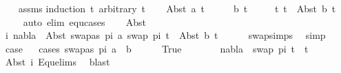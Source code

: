 \begin{isabellebody}
%
\isadelimproof
\ \ %
\endisadelimproof
%
\isatagproof
{}\isamarkupfalse%
\ assms\isanewline
{}\isamarkupfalse%
{\isacharparenleft}{\kern0pt}induction\ t{}\ arbitrary{\isacharcolon}{\kern0pt}\ t{}{\isacharparenright}{\kern0pt}\isanewline
\ \ \isamarkupfalse%
\ {\isacharparenleft}{\kern0pt}Abst\ a\ t{}{\isacharprime}{\kern0pt}{\isacharparenright}{\kern0pt}\isanewline
\ \ \isamarkupfalse%
\ \isamarkupfalse%
\ b\ t{}{\isacharprime}{\kern0pt}\isanewline
\ \ \ \ \ t{}{\isacharcolon}{\kern0pt}\ {\isachardoublequoteopen}t{}\ {\isacharequal}{\kern0pt}\ Abst\ b\ t{}{\isacharprime}{\kern0pt}{\isachardoublequoteclose}\isanewline
\ \ \ \ \isamarkupfalse%
{\isacharparenleft}{\kern0pt}auto\ elim{\isacharcolon}{\kern0pt}\ equ{\isachardot}{\kern0pt}cases{\isacharparenright}{\kern0pt}\isanewline
\ \ \isamarkupfalse%
\ Abst\ \isamarkupfalse%
\ i{\isacharcolon}{\kern0pt}\ {\isachardoublequoteopen}nabla\ {\isasymturnstile}\ Abst\ {\isacharparenleft}{\kern0pt}swapas\ pi{}\ a{\isacharparenright}{\kern0pt}\ {\isacharparenleft}{\kern0pt}swap\ pi{}\ t{}{\isacharprime}{\kern0pt}{\isacharparenright}{\kern0pt}\ {\isasymapprox}\ Abst\ b\ t{}{\isacharprime}{\kern0pt}{\isachardoublequoteclose}\isanewline
\ \ \ \ \isamarkupfalse%
\ swap{\isachardot}{\kern0pt}simps{\isacharparenleft}{\kern0pt}{}{\isacharparenright}{\kern0pt}\ \isamarkupfalse%
\ simp\isanewline
\ \ \isamarkupfalse%
\ \isamarkupfalse%
\ {\isacharquery}{\kern0pt}case\isanewline
\ \ \isamarkupfalse%
{\isacharparenleft}{\kern0pt}cases\ {\isacartoucheopen}swapas\ pi{}\ a\ {\isacharequal}{\kern0pt}\ b{\isacartoucheclose}{\isacharparenright}{\kern0pt}\isanewline
\ \ \ \ \isamarkupfalse%
\ True\isanewline
\ \ \ \ \isamarkupfalse%
\ \isamarkupfalse%
\ {\isachardoublequoteopen}nabla\ {\isasymturnstile}\ swap\ pi{}\ t{}{\isacharprime}{\kern0pt}\ {\isasymapprox}\ t{}{\isacharprime}{\kern0pt}{\isachardoublequoteclose}\ \isanewline
\ \ \ \ \ \ \isamarkupfalse%
\ Abst\ i\ Equ{\isacharunderscore}{\kern0pt}elims{\isacharparenleft}{\kern0pt}{}{\isacharparenright}{\kern0pt}\ \isamarkupfalse%
\ blast\isanewline
\ \ \ \ \isamarkupfalse%

\end{isabellebody}

